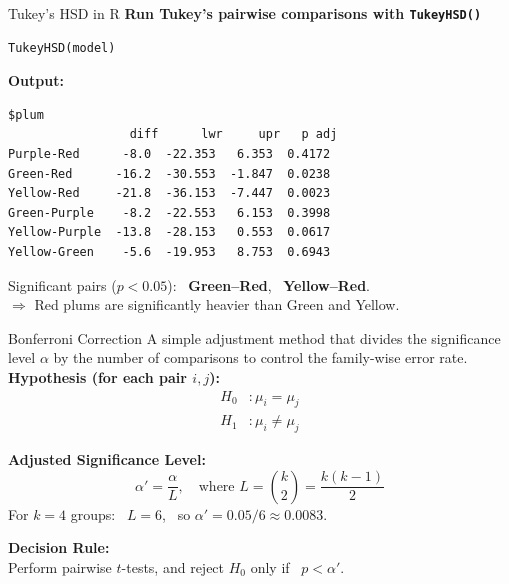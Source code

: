 \documentclass[aspectratio=169]{beamer}
\begin{document}
\begin{frame}[fragile]{Tukey's HSD in R}
\textbf{Run Tukey's pairwise comparisons with \texttt{TukeyHSD()}}
\begin{lstlisting}
TukeyHSD(model)
\end{lstlisting}

\vspace{4pt}
\textbf{Output:}
\begin{lstlisting}[numbers=none, backgroundcolor=\color{yellow!8}]
$plum
                 diff      lwr     upr   p adj
Purple-Red      -8.0  -22.353   6.353  0.4172
Green-Red      -16.2  -30.553  -1.847  0.0238
Yellow-Red     -21.8  -36.153  -7.447  0.0023
Green-Purple    -8.2  -22.553   6.153  0.3998
Yellow-Purple  -13.8  -28.153   0.553  0.0617
Yellow-Green    -5.6  -19.953   8.753  0.6943
\end{lstlisting}

\vspace{4pt}
Significant pairs ($p < 0.05$): \ \textbf{Green--Red}, \ \textbf{Yellow--Red}. \\
$\Rightarrow$ Red plums are significantly heavier than Green and Yellow.
\end{frame}


\begin{frame}{Bonferroni Correction}
A simple adjustment method that divides the significance level $\alpha$ by the number of comparisons to control the family-wise error rate. \\
\vspace{5pt}
\textbf{Hypothesis (for each pair $i, j$):}
\[
\begin{aligned}
H_0 &: \mu_i = \mu_j \\
H_1 &: \mu_i \neq \mu_j
\end{aligned}
\]
\vspace{2pt}

\textbf{Adjusted Significance Level:}
\[
\alpha' = \frac{\alpha}{L}, \quad \text{where } L = \binom{k}{2} = \frac{k(k-1)}{2}
\]
For $k = 4$ groups: \ $L = 6$, \ so $\alpha' = 0.05 / 6 \approx 0.0083$.\\
\vspace{6pt}

\textbf{Decision Rule:}\\
Perform pairwise $t$-tests, and reject $H_0$ only if \ $p < \alpha'$.
\end{frame}
\end{document}
